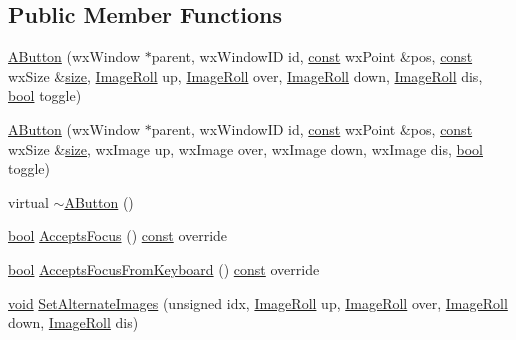 \subsection*{Public Member Functions}
\begin{DoxyCompactItemize}
\item 
\hyperlink{class_a_button_a76a53359dd32e2ec11b082c2af00c23b}{A\+Button} (wx\+Window $\ast$parent, wx\+Window\+ID id, \hyperlink{getopt1_8c_a2c212835823e3c54a8ab6d95c652660e}{const} wx\+Point \&pos, \hyperlink{getopt1_8c_a2c212835823e3c54a8ab6d95c652660e}{const} wx\+Size \&\hyperlink{group__lavu__mem_ga854352f53b148adc24983a58a1866d66}{size}, \hyperlink{class_image_roll}{Image\+Roll} up, \hyperlink{class_image_roll}{Image\+Roll} over, \hyperlink{class_image_roll}{Image\+Roll} down, \hyperlink{class_image_roll}{Image\+Roll} dis, \hyperlink{mac_2config_2i386_2lib-src_2libsoxr_2soxr-config_8h_abb452686968e48b67397da5f97445f5b}{bool} toggle)
\item 
\hyperlink{class_a_button_ac983220b8a03543fc34565979e77bd72}{A\+Button} (wx\+Window $\ast$parent, wx\+Window\+ID id, \hyperlink{getopt1_8c_a2c212835823e3c54a8ab6d95c652660e}{const} wx\+Point \&pos, \hyperlink{getopt1_8c_a2c212835823e3c54a8ab6d95c652660e}{const} wx\+Size \&\hyperlink{group__lavu__mem_ga854352f53b148adc24983a58a1866d66}{size}, wx\+Image up, wx\+Image over, wx\+Image down, wx\+Image dis, \hyperlink{mac_2config_2i386_2lib-src_2libsoxr_2soxr-config_8h_abb452686968e48b67397da5f97445f5b}{bool} toggle)
\item 
virtual \hyperlink{class_a_button_ade4e33830c20aee1b587d56a01689de5}{$\sim$\+A\+Button} ()
\item 
\hyperlink{mac_2config_2i386_2lib-src_2libsoxr_2soxr-config_8h_abb452686968e48b67397da5f97445f5b}{bool} \hyperlink{class_a_button_aa918c438d5f96e08bd5beb01c690684e}{Accepts\+Focus} () \hyperlink{getopt1_8c_a2c212835823e3c54a8ab6d95c652660e}{const}  override
\item 
\hyperlink{mac_2config_2i386_2lib-src_2libsoxr_2soxr-config_8h_abb452686968e48b67397da5f97445f5b}{bool} \hyperlink{class_a_button_a6b9d13200aa98d329cfc112c57911945}{Accepts\+Focus\+From\+Keyboard} () \hyperlink{getopt1_8c_a2c212835823e3c54a8ab6d95c652660e}{const}  override
\item 
\hyperlink{sound_8c_ae35f5844602719cf66324f4de2a658b3}{void} \hyperlink{class_a_button_ac02fd3b9555ef38f519a6237dfca78d5}{Set\+Alternate\+Images} (unsigned idx, \hyperlink{class_image_roll}{Image\+Roll} up, \hyperlink{class_image_roll}{Image\+Roll} over, \hyperlink{class_image_roll}{Image\+Roll} down, \hyperlink{class_image_roll}{Image\+Roll} dis)

\end{DoxyCompactItemize}
